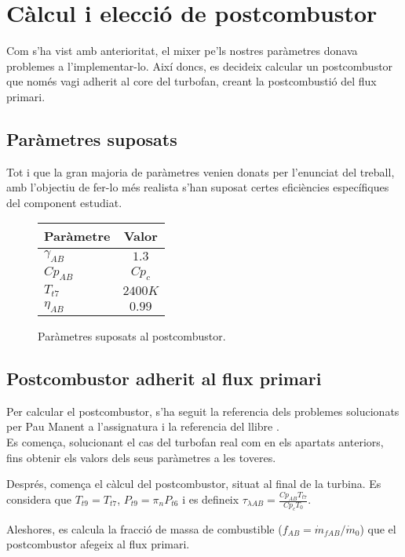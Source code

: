 \clearpage
\section{Càlcul i elecció de postcombustor}
Com s'ha vist amb anterioritat, el mixer pe'ls nostres paràmetres donava problemes a l'implementar-lo. Així doncs, es decideix calcular un postcombustor que només vagi adherit al core del turbofan, creant la postcombustió del flux primari.

\subsection{Paràmetres suposats }
Tot i que la gran majoria de paràmetres venien donats per l'enunciat del treball, amb l'objectiu de fer-lo més realista s'han suposat certes eficiències específiques del component estudiat.

\begin{figure}[H]
	\centering
	\begin{tabular}{lc}
		\toprule[3pt]
		\textbf{Paràmetre}&\textbf{Valor}\\
		\midrule[1pt]
		$\gamma_{AB}$ & $1.3$\\
		$ Cp_{AB}$ & $Cp_c$\\
		$T_{t7}$ & $2400K$\\
		$\eta_{AB}$ & $0.99$\\
		
		\bottomrule[2pt]
	\end{tabular}
	\label{ABparam}
	\caption{Paràmetres suposats al postcombustor.}
\end{figure}


\subsection{Postcombustor adherit al flux primari}
Per calcular el postcombustor, s'ha seguit la referencia dels problemes solucionats per Pau Manent a l'assignatura i la referencia del llibre \cite{mattingly}.\\

\noindent Es comença, solucionant el cas del turbofan real com en els apartats anteriors, fins obtenir els valors dels seus paràmetres a les toveres.

\noindent Després, comença el càlcul del postcombustor, situat al final de la turbina. Es considera que $T_{t9} = T_{t7}$, $P_{t9}=\pi_nP_{t6}$ i es defineix $\tau_{\lambda AB} = \frac{Cp_{AB}T_{t7}}{Cp_cT_0}$.

\noindent Aleshores, es calcula la fracció de massa de combustible ($f_{AB}=\dot{m}_{fAB}/\dot{m}_0$) que el postcombustor afegeix al flux primari.

